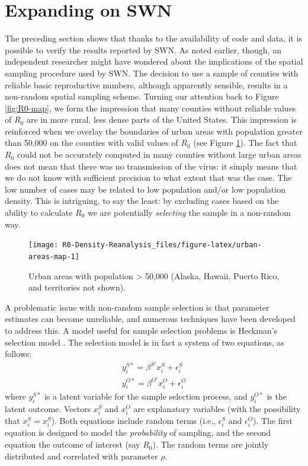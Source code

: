 \documentclass[preprint, 3p,
authoryear]{elsarticle} %
\begin{document}
\hypertarget{expanding-on-swn}{%
\section{Expanding on SWN}\label{expanding-on-swn}}

The preceding section shows that thanks to the availability of code and
data, it is possible to verify the results reported by SWN. As noted
earlier, though, an independent researcher might have wondered about the
implications of the spatial sampling procedure used by SWN. The decision
to use a sample of counties with reliable basic reproductive numbers,
although apparently sensible, results in a non-random spatial sampling
scheme. Turning our attention back to Figure \ref{fig:R0-map}, we form
the impression that many counties without reliable values of \(R_0\) are
in more rural, less dense parts of the United States. This impression is
reinforced when we overlay the boundaries of urban areas with population
greater than 50,000 on the counties with valid values of \(R_0\) (see
Figure \ref{fig:urban-areas-map}). The fact that \(R_0\) could not be
accurately computed in many counties without large urban areas does not
mean that there was no transmission of the virus: it simply means that
we do not know with sufficient precision to what extent that was the
case. The low number of cases may be related to low population and/or
low population density. This is intriguing, to say the least: by
excluding cases based on the ability to calculate \(R_0\) we are
potentially \emph{selecting} the sample in a non-random way.

\begin{figure}
\texttt{[image: R0-Density-Reanalysis\_files/figure-latex/urban-areas-map-1]} \caption{\label{fig:urban-areas-map}Urban areas with population > 50,000 (Alaska, Hawaii, Puerto Rico, and territories not shown).}\label{fig:urban-areas-map}
\end{figure}

A problematic issue with non-random sample selection is that parameter
estimates can become unreliable, and numerous techniques have been
developed to address this. A model useful for sample selection problems
is Heckman's selection model \citep[see][]{Maddala1983limited}. The
selection model is in fact a system of two equations, as follows: \[
\begin{array}{c}
y_i^{S*} = \beta^{S\prime}x_i^S+\epsilon_i^S\\
y_i^{O*} = \beta^{O\prime}x_i^O+\epsilon_i^O
\end{array}
\] \noindent where \(y_i^{S*}\) is a latent variable for the sample
selection process, and \(y_i^{O*}\) is the latent outcome. Vectors
\(x_i^S\) and \(x_i^O\) are explanatory variables (with the possibility
that \(x_i^S = x_i^S\)). Both equations include random terms (i.e.,
\(\epsilon_i^S\) and \(\epsilon_i^O\)). The first equation is designed
to model the \emph{probability} of sampling, and the second equation the
outcome of interest (say \(R_0\)). The random terms are jointly
distributed and correlated with parameter \(\rho\).
\end{document}
